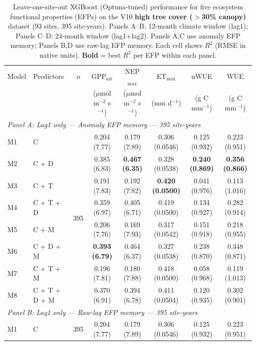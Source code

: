 \begin{table}[htbp]
\centering
\caption{Leave-one-site-out XGBoost (Optuna-tuned) performance for five ecosystem functional properties (EFPs) on the V10 \textbf{high tree cover ($>$30\% canopy)} dataset (93 sites, 395 site-years). Panels A--B: 12-month climate window (lag1); Panels C--D: 24-month window (lag1+lag2). Panels A,C use anomaly EFP memory; Panels B,D use raw-lag EFP memory. Each cell shows $R^2$ (RMSE in native units). \textbf{Bold} = best $R^2$ per EFP within each panel.}
\label{tab:XGBoptuna_LOSO_v10_filtered}
\footnotesize
\setlength{\tabcolsep}{4pt}
\begin{tabular}{llcccccc}
\toprule
Model & Predictors & $n$ & GPP$_\mathrm{sat}$ & NEP$_\mathrm{max}$ & ET$_\mathrm{max}$ & uWUE & WUE \\
  &  &  & ($\mu$mol m$^{-2}$ s$^{-1}$) & ($\mu$mol m$^{-2}$ s$^{-1}$) & (mm d$^{-1}$) & (g C mm$^{-1}$) & (g C mm$^{-1}$) \\
\midrule
\multicolumn{8}{l}{\textit{Panel A: Lag1 only --- Anomaly EFP memory --- 395 site-years}} \\
\midrule
M1 & C & \multirow{8}{*}{395} & 0.204 (7.77) & 0.179 (7.89) & 0.306 (0.0546) & 0.125 (0.932) & 0.223 (0.951) \\
M2 & C + D &  & 0.385 (6.83) & \textbf{0.467 (6.35)} & 0.328 (0.0538) & \textbf{0.240 (0.869)} & \textbf{0.356 (0.866)} \\
M3 & C + T &  & 0.191 (7.83) & 0.192 (7.82) & \textbf{0.420 (0.0500)} & 0.041 (0.976) & 0.113 (1.016) \\
M4 & C + T + D &  & 0.359 (6.97) & 0.405 (6.71) & 0.419 (0.0500) & 0.134 (0.927) & 0.282 (0.914) \\
M5 & C + M &  & 0.206 (7.76) & 0.169 (7.93) & 0.317 (0.0542) & 0.151 (0.918) & 0.218 (0.955) \\
M6 & C + D + M &  & \textbf{0.393 (6.79)} & 0.464 (6.37) & 0.327 (0.0538) & 0.238 (0.870) & 0.348 (0.871) \\
M7 & C + T + M &  & 0.196 (7.81) & 0.180 (7.88) & 0.418 (0.0500) & 0.058 (0.968) & 0.119 (1.013) \\
M8 & C + T + D + M &  & 0.370 (6.91) & 0.394 (6.78) & 0.411 (0.0504) & 0.120 (0.935) & 0.302 (0.901) \\
\midrule
\multicolumn{8}{l}{\textit{Panel B: Lag1 only --- Raw-lag EFP memory --- 395 site-years}} \\
\midrule
M1 & C & \multirow{8}{*}{395} & 0.204 (7.77) & 0.179 (7.89) & 0.306 (0.0546) & 0.125 (0.932) & 0.223 (0.951) \\

\end{tabular}
\end{table}
